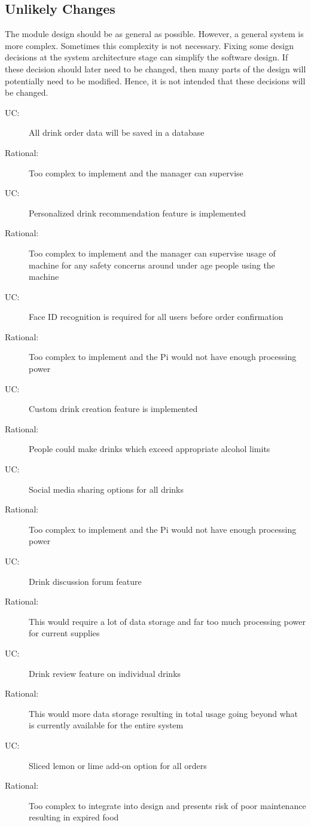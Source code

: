 \documentclass[12pt, titlepage]{article}
\newcounter{ucnum}
\newcommand{\uctheucnum}{UC\theucnum}
\begin{document}
\subsection{Unlikely Changes} \label{SecUchange}

The module design should be as general as possible. However, a general system is
more complex. Sometimes this complexity is not necessary. Fixing some design
decisions at the system architecture stage can simplify the software design. If
these decision should later need to be changed, then many parts of the design
will potentially need to be modified. Hence, it is not intended that these
decisions will be changed.

\begin{description}
\item[ \uctheucnum \label{ucIO}:] All drink order data will be saved in a database
\item [Rational:] Too complex to implement and the manager can supervise

\item[ \uctheucnum \label{ucIO}:] Personalized drink recommendation feature is implemented
\item [Rational:] Too complex to implement and the manager can supervise usage of machine for any safety concerns around under age people using the machine 

\item[ \uctheucnum \label{ucIO}:] Face ID recognition is required for all users before order confirmation
\item [Rational:] Too complex to implement and the Pi would not have enough processing power

\item[ \uctheucnum \label{ucIO}:] Custom drink creation feature is implemented
\item [Rational:] People could make drinks which exceed appropriate alcohol limits

\item[ \uctheucnum \label{ucIO}:] Social media sharing options for all drinks
\item [Rational:] Too complex to implement and the Pi would not have enough processing power

\item[ \uctheucnum \label{ucIO}:] Drink discussion forum feature
\item [Rational:] This would require a lot of data storage and far too much processing power for current supplies
\item[ \uctheucnum \label{ucIO}:] Drink review feature on individual drinks
\item [Rational:] This would more data storage resulting in total usage going beyond what is currently available for the entire system
\item[ \uctheucnum \label{ucIO}:] Sliced lemon or lime add-on option for all orders
\item [Rational:] Too complex to integrate into design and presents risk of poor maintenance resulting in expired food


\end{description}
\end{document}
